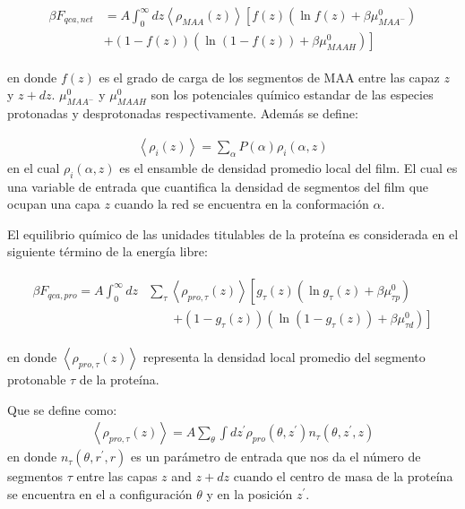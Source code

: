 \begin{align}
	\begin{aligned}
		\beta F_{qca,net} &= A\int_0^\infty dz \left<\rho_{MAA}(z)\right> \left[f(z)(\ln f(z)+ \beta\mu^0_{MAA^-})\right.\\
		&\left.+(1-f(z))(\ln (1-f(z))+\beta\mu^0_{MAAH})\right]    
	\end{aligned}
\end{align} 

\noindent en donde $f(z)$ es el grado de carga de los segmentos de MAA entre las capaz $z$ y $z + dz$. 
$\mu^0_{MAA^-}$ y $\mu^0_{MAAH}$ son los potenciales qu\'imico estandar  de las especies protonadas y desprotonadas respectivamente.
Adem\'as se define:

\begin{align}
	\left< \rho_i(z)\right> = \sum_\alpha{P(\alpha)\rho_i(\alpha,z)}
\end{align}
\noindent en el cual $\rho_i(\alpha,z)$  es el ensamble de densidad  promedio local del film. El cual es una variable de entrada que cuantifica la densidad de segmentos del film que  ocupan una capa $z$ cuando la red se encuentra en la conformaci\'on $\alpha$.


El equilibrio qu\'imico de las unidades titulables de la prote\'ina es considerada en el siguiente t\'ermino de la energ\'ia libre:

\begin{align}
	\begin{aligned}
		\beta F_{qca,pro} = A\int_0^\infty dz& \sum_\tau \left<\rho_{pro,\tau}(z)\right> \left[g_\tau(z)(\ln g_\tau(z)+ \beta\mu^0_{\tau p})\right.\\
		&\qquad\left.+(1-g_\tau(z))(\ln (1-g_\tau(z))+\beta\mu^0_{\tau d})\right]   
	\end{aligned}
\end{align} 

\noindent en donde $\left<\rho_{pro,\tau}(z)\right>$ representa la densidad local promedio del segmento protonable $\tau$ de la prote\'ina.

Que se define como:
\begin{align}
	\left<\rho_{pro,\tau}(z)\right> = A\sum_\theta \int dz^\prime  \rho_{pro}(\theta,z^\prime)n_\tau(\theta,z^\prime, z)
	\label{eq:film:segments_pro_si}
\end{align}
\noindent en donde $n_\tau(\theta,r^\prime, r)$ es un par\'ametro de entrada que nos da el n\'umero de segmentos $\tau$ entre las capas $z$ and $z+ dz$ cuando el centro de masa de la prote\'ina se encuentra en el a configuraci\'on $\theta$ y en la posici\'on $z^\prime$.

